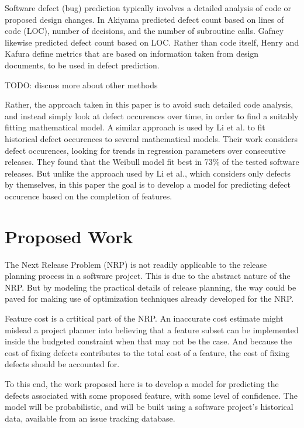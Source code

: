 \documentclass[a4paper]{scrartcl}
\begin{document}
Software defect (bug) prediction typically involves a detailed analysis of code or proposed design changes. In Akiyama \cite{akiyama1971example} predicted defect count based on lines of code (LOC), number of decisions, and the number of subroutine calls. Gafney \cite{gaffney1984estimating} likewise predicted defect count based on LOC. Rather than code itself, Henry and Kafura \cite{henry1984evaluation} define metrics that are based on information taken from design documents, to be used in defect prediction.

TODO: discuss more about other methods

Rather, the approach taken in this paper is to avoid such detailed code analysis, and instead simply look at defect occurences over time, in order to find a suitably fitting mathematical model. A similar approach is used by Li et al. \cite{li2004empirical} to fit historical defect occurences to several mathematical models. Their work considers defect occurences, looking for trends in regression parameters over consecutive releases. They found that the Weibull model fit best in 73\% of the tested software releases. But unlike the approach used by Li et al., which considers only defects by themselves, in this paper the goal is to develop a model for predicting defect occurence based on the completion of features.

\section{Proposed Work}
The Next Release Problem (NRP) is not readily applicable to the release planning process in a software project. This is due to the abstract nature of the NRP. But by modeling the practical details of release planning, the way could be paved for making use of optimization techniques already developed for the NRP.

Feature cost is a crtitical part of the NRP. An inaccurate cost estimate might mislead a project planner into believing that a feature subset can be implemented inside the budgeted constraint when that may not be the case. And because the cost of fixing defects contributes to the total cost of a feature, the cost of fixing defects should be accounted for.

To this end, the work proposed here is to develop a model for predicting the defects associated with some proposed feature, with some level of confidence. The model will be probabilistic, and will be built using a software project's historical data, available from an issue tracking database.
\end{document}
